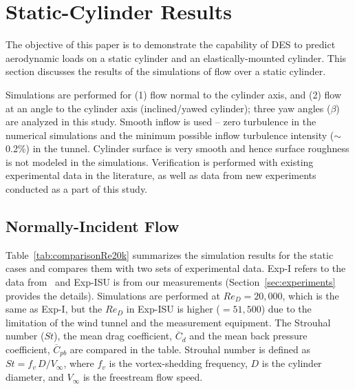 \section{Static-Cylinder Results}
\label{sec:comp_results}
%
The objective of this paper is to demonstrate the capability of DES to predict
aerodynamic loads on a static cylinder and an elastically-mounted cylinder.
This section discusses the results of the simulations of flow over a static
cylinder.

Simulations are performed for (1) flow normal to the cylinder axis, and (2)
flow at an angle to the cylinder axis (inclined/yawed cylinder); three yaw
angles ($\beta$) are analyzed in this study. Smooth inflow is used -- zero
turbulence in the numerical simulations and the minimum possible inflow
turbulence intensity ($\sim$0.2\%) in the tunnel. Cylinder surface is very
smooth and hence surface roughness is not modeled in the simulations.
Verification is performed with existing experimental data in the literature, as
well as data from new experiments conducted as a part of this study.

\subsection{Normally-Incident Flow}
\label{sec:normally_incident}
%
Table~\ref{tab:comparisonRe20k} summarizes the simulation results for the
static cases and compares them with two sets of experimental data. Exp-I refers
to the data from~\cite{norberg2013pressure} and Exp-ISU is from our
measurements (Section~\ref{sec:experiments} provides the details). Simulations
are performed at $Re_D=20,000$, which is the same as Exp-I, but the $Re_D$ in
Exp-ISU is higher ($=51,500$) due to the limitation of the wind tunnel and the
measurement equipment. The Strouhal number ($St$), the mean drag coefficient,
$\overline{C}_d$ and the mean back pressure coefficient, $\overline{C}_{pb}$
are compared in the table. Strouhal number is defined as $St =
f_v\,D/V_\infty$, where $f_v$ is the vortex-shedding frequency, $D$ is the
cylinder diameter, and $V_\infty$ is the freestream flow speed.

